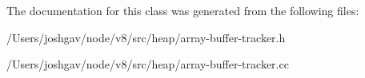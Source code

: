 The documentation for this class was generated from the following files\+:\begin{DoxyCompactItemize}
\item 
/\+Users/joshgav/node/v8/src/heap/array-\/buffer-\/tracker.\+h\item 
/\+Users/joshgav/node/v8/src/heap/array-\/buffer-\/tracker.\+cc\end{DoxyCompactItemize}

